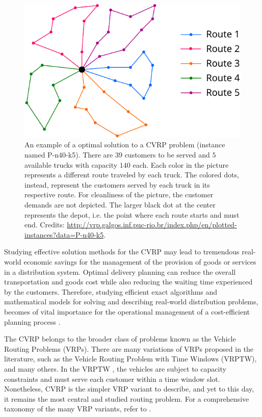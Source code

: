 \begin{figure}[t]
	\centering
	\includegraphics[width=12cm]{Imgs/P-n40-k5-solution.out.cropped.pdf}
	\caption{An example of a optimal solution to a CVRP problem (instance named P-n40-k5).
		There are 39 customers to be served and $5$ available trucks with capacity $140$ each.
		Each color in the picture represents a different route traveled by each truck.
		The colored dots, instead, represent the customers served by each truck in its respective route.
		For cleanliness of the picture, the customer demands are not depicted.
		The larger black dot at the center represents the depot, i.e. the point where each route starts and must end.
		Credits: \url{http://vrp.galgos.inf.puc-rio.br/index.php/en/plotted-instances?data=P-n40-k5}.
	}
	\label{fig:cvrp-optimal-solution-example}
\end{figure}

Studying effective solution methods for the CVRP may lead to tremendous real-world economic
savings for the management of the provision of goods or services in a distribution system.
Optimal delivery planning can reduce the overall transportation and goods cost while
also reducing the waiting time experienced by the customers.
Therefore, studying efficient exact algorithms and mathematical models for
solving and describing real-world distribution problems,
becomes of vital importance
for the operational management of a cost-efficient planning process \parencite{toth2002,toth2014}.

The CVRP belongs to the broader class of problems known as the Vehicle Routing Problems (VRPs).
There are many variations of VRPs proposed in the literature, such as
the Vehicle Routing Problem with Time Windows (VRPTW), and many others.
In the VRPTW \parencite{schrage1981}, the vehicles are subject to capacity constraints
and must serve each customer within a time window slot.
Nonetheless, CVRP is the simpler VRP variant to describe,
and yet to this day, it remains the most central and studied routing problem.
For a comprehensive taxonomy of the many VRP variants, refer to \textcite{eksioglu2009, braekers2016}.

